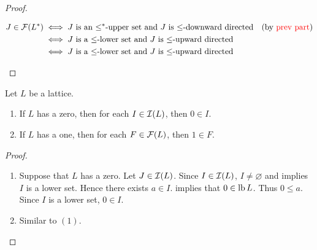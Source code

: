 \documentclass{book}
\begin{document}
\begin{proof}
\begin{enumerate}
\begin{enumerate}
				\begin{align*}
					J \in \mathcal{F}(L^*) 
					& \iff \text{$J$ is an $\leq^*$-upper set and $J$ is $\leq$-downward directed} \quad \text{(by \textcolor{red}{prev part})} \\
					& \iff \text{$J$ is a $\leq$-lower set and $J$ is $\leq$-upward directed} \\
					& \iff \text{$J$ is a $\leq$-lower set and $J$ is $\leq$-upward directed}
				\end{align*}
			\end{enumerate}
		\end{enumerate}
	\end{proof}
	
	\begin{ex}
		Let $L$ be a lattice. 
		\begin{enumerate}
			\item If $L$ has a zero, then for each $I \in \mathcal{I}(L)$, then $0 \in I$.
			\item If $L$ has a one, then for each $F \in \mathcal{F}(L)$, then $1 \in F$.
		\end{enumerate} 
	\end{ex}
	
	\begin{proof}\
		\begin{enumerate}
			\item Suppose that $L$ has a zero. Let $J \in \mathcal{I}(L)$. Since $I \in \mathcal{I}(L)$, $I \neq \varnothing$ and  implies $I$ is a lower set. Hence there exists $a \in I$.  implies that $0 \in \operatorname{lb} L$. Thus $0 \leq a$. Since $I$ is a lower set, $0 \in I$.
			\item Similar to $(1)$.
		\end{enumerate} 
	\end{proof}
	
\end{document}
